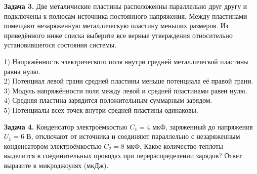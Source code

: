 \begin{taskbasic}[code={\label{task:elem_cap_v29_n15}}]
\textbf{Задача 3.} Две металичиские пластины расположенны параллельно друг другу и подключены к полюсам источника постоянного напряжения. Между пластинами помещают незаряженную металлическую пластину меньших размеров. Из приведённого ниже списка выберите все верные утверждения относительно установившегося состояния системы.

\nopagebreak\smallskip
\begin{center}
\end{center}

1) Напряжённость электрического поля внутри средней металлической пластины равна нулю.\\
2) Потенциал левой грани средней пластины меньше потенциала её правой грани.\\
3) Модуль напряжённости поля между левой и средней пластинами равен нулю.\\
4) Средняя пластина зарядится положительным суммарным зарядом.\\
5) Потенциалы всех точек внутри средней пластины одинаковы.

\end{taskbasic}

\begin{taskbasic}[code={\label{task:elem_cap_v30_n25}}]
\textbf{Задача 4.} Конденсатор электроёмкостью $C_1 = 4\text{ мкФ}$, заряженный до напряжения $U_1 = 6\text{ В}$, отключают от источника и соединяют параллельно с незаряженным конденсатором электроёмкостью $C_2 = 8\text{ мкФ}$. Какое количество теплоты выделится в соединительных проводах при перераспределении зарядов? Ответ выразите в микроджоулях (мкДж).

\end{taskbasic}
